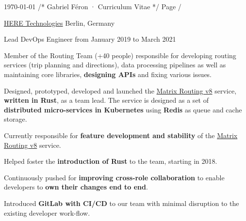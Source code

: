 \documentclass[10pt, a4paper]{awesome-cv}
\begin{document}
\raggedright

\makecvheader

\makecvfooter
{\today}
{/* Gabriel Féron · Curriculum Vitae */}
{Page \thepage /\pageref{LastPage}}

\begin{cventries}
	\cventrytitle
	{\href{https://developer.here.com}{HERE Technologies}}
	{Berlin, Germany}

	\cventry
	{Lead DevOps Engineer}
	{from January 2019 to March 2021}
	{
		\begin{cvparagraph}
			Member of the Routing Team (+40 people) responsible for developing routing services (trip planning and directions), data processing pipelines as well as maintaining core libraries, \textbf{designing APIs} and fixing various issues.
		\end{cvparagraph}
		\begin{cvitems}
			\item {Designed, prototyped, developed and launched the \href{https://developer.here.com/documentation/large-matrix/api-reference-swagger.html}{Matrix Routing v8} service, \textbf{written in Rust}, as a team lead.
			            The service is designed as a set of \textbf{distributed micro-services in Kubernetes} using \textbf{Redis} as queue and cache storage.}
			\item {Currently responsible for \textbf{feature development and stability} of the \href{https://developer.here.com/documentation/large-matrix/api-reference-swagger.html}{Matrix Routing v8} service.}
			\item {Helped foster the \textbf{introduction of Rust} to the team, starting in 2018.}
			\item {Continuously pushed for \textbf{improving cross-role collaboration} to enable developers to \textbf{own their changes end to end}.}
			\item {Introduced \textbf{GitLab with CI/CD} to our team with minimal disruption to the existing developer work-flow.}
		\end{cvitems}
	}


\end{cventries}
\end{document}
